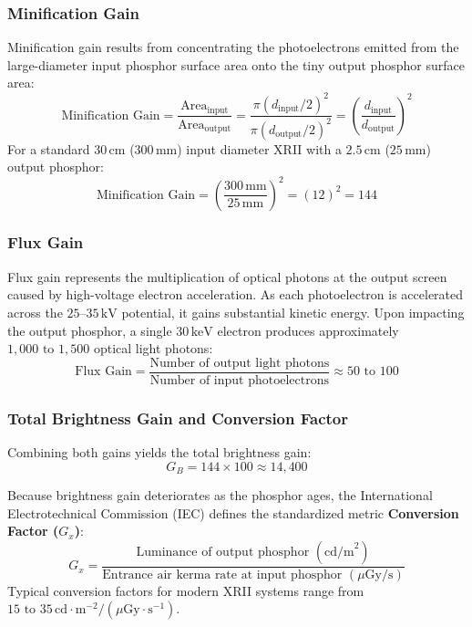 \documentclass[11pt,a4paper]{article}
\begin{document}
\subsubsection{Minification Gain}
Minification gain results from concentrating the photoelectrons emitted from the large-diameter input phosphor surface area onto the tiny output phosphor surface area:
\begin{equation}
    \text{Minification Gain} = \frac{\text{Area}_{\text{input}}}{\text{Area}_{\text{output}}} = \frac{\pi (d_{\text{input}} / 2)^2}{\pi (d_{\text{output}} / 2)^2} = \left( \frac{d_{\text{input}}}{d_{\text{output}}} \right)^2
\end{equation}
For a standard $30\,\text{cm}$ ($300\,\text{mm}$) input diameter XRII with a $2.5\,\text{cm}$ ($25\,\text{mm}$) output phosphor:
\begin{equation}
    \text{Minification Gain} = \left( \frac{300\,\text{mm}}{25\,\text{mm}} \right)^2 = (12)^2 = 144
\end{equation}

\subsubsection{Flux Gain}
Flux gain represents the multiplication of optical photons at the output screen caused by high-voltage electron acceleration. As each photoelectron is accelerated across the $25\text{--}35\,\text{kV}$ potential, it gains substantial kinetic energy. Upon impacting the output phosphor, a single $30\,\text{keV}$ electron produces approximately $1,000\text{ to }1,500$ optical light photons:
\begin{equation}
    \text{Flux Gain} = \frac{\text{Number of output light photons}}{\text{Number of input photoelectrons}} \approx 50\text{ to }100
\end{equation}

\subsubsection{Total Brightness Gain and Conversion Factor}
Combining both gains yields the total brightness gain:
\begin{equation}
    G_B = 144 \times 100 \approx 14{,}400
\end{equation}

Because brightness gain deteriorates as the phosphor ages, the International Electrotechnical Commission (IEC) defines the standardized metric \textbf{Conversion Factor ($G_x$)}:
\begin{equation}
    G_x = \frac{\text{Luminance of output phosphor } (\text{cd/m}^2)}{\text{Entrance air kerma rate at input phosphor } (\mu\text{Gy/s})}
\end{equation}
Typical conversion factors for modern XRII systems range from $15\text{ to }35\,\text{cd}\cdot\text{m}^{-2} / (\mu\text{Gy}\cdot\text{s}^{-1})$.
\end{document}
